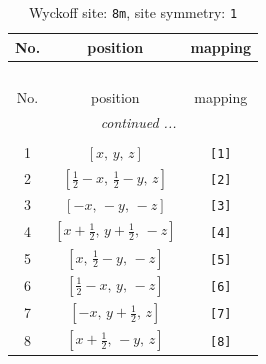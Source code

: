 \documentclass[fleqn,8pt]{jsarticle}
\begin{document}
\renewcommand{\arraystretch}{1.2}
\begin{longtable}{ccc}
\caption{Wyckoff site: {\tt 8m}, site symmetry: {\tt 1}}
 \\
 \hline \hline
No. & position & mapping \\ \hline \endfirsthead

\multicolumn{2}{l}{\tablename\ \thetable{}} \\
 \hline \hline
No. & position & mapping \\ \hline \endhead

 \hline \hline
\multicolumn{2}{r}{\footnotesize\it continued ...} \\ \endfoot

 \hline \hline
\multicolumn{2}{r}{} \\ \endlastfoot

1 & $\left[ x,\, y,\, z \right]$ & {\tt [1]} \\ \hline
2 & $\left[ \frac{1}{2} - x,\, \frac{1}{2} - y,\, z \right]$ & {\tt [2]} \\ \hline
3 & $\left[ - x,\, - y,\, - z \right]$ & {\tt [3]} \\ \hline
4 & $\left[ x + \frac{1}{2},\, y + \frac{1}{2},\, - z \right]$ & {\tt [4]} \\ \hline
5 & $\left[ x,\, \frac{1}{2} - y,\, - z \right]$ & {\tt [5]} \\ \hline
6 & $\left[ \frac{1}{2} - x,\, y,\, - z \right]$ & {\tt [6]} \\ \hline
7 & $\left[ - x,\, y + \frac{1}{2},\, z \right]$ & {\tt [7]} \\ \hline
8 & $\left[ x + \frac{1}{2},\, - y,\, z \right]$ & {\tt [8]} \\
\end{longtable}
\end{document}
